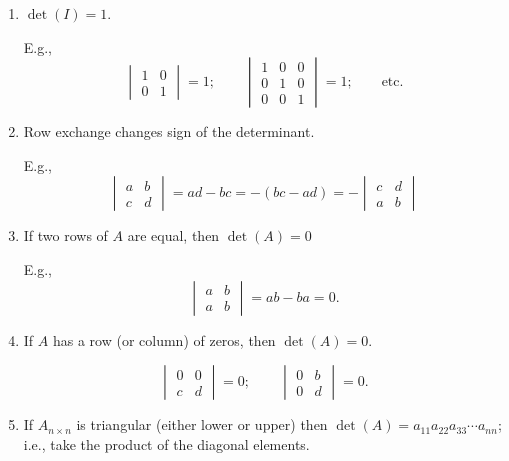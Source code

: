 \documentclass[reqno]{amsart}
\theoremstyle{definition}
\begin{document}
\begin{enumerate}

\item  $\det(I) = 1$.

E.g.,
%
\begin{equation*}
\begin{vmatrix}
1 & 0\\
0 &1
\end{vmatrix} = 1; \qquad \begin{vmatrix}
1 & 0 & 0\\
0 & 1 & 0\\
0 & 0 & 1
\end{vmatrix} = 1; \qquad \text{etc.}
\end{equation*}

\item  Row exchange changes sign of the determinant.

E.g.,
\begin{equation*}
\begin{vmatrix}
a & b\\
c & d
\end{vmatrix} = ad - bc = -(bc - ad) = -\begin{vmatrix}
c & d\\
a & b
\end{vmatrix}
\end{equation*}

\item  If two rows of $A$ are equal, then $\det(A) = 0$

E.g.,
%
\begin{equation*}
\begin{vmatrix}
a & b\\
a & b
\end{vmatrix} = ab - ba = 0.
\end{equation*}

\item  If $A$ has a row (or column) of zeros, then $\det(A) = 0$.

\begin{equation*}
\begin{vmatrix}
0 & 0\\
c & d
\end{vmatrix} = 0;\qquad \begin{vmatrix}
0 & b\\
0 & d
\end{vmatrix} = 0.
\end{equation*}

\item  If $A_{n \times n}$ is triangular (either lower or upper) then $\det(A) = a_{11}a_{22}a_{33}\cdots a_{nn}$; i.e.,
take the product of the diagonal elements.


\end{enumerate}
\end{document}

